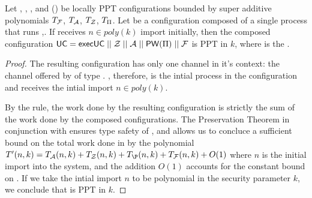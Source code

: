 \begin{theorem} \label{thm:soundness}
Let \F, \A, \Z, and (\PI) be locally PPT configurations bounded by super additive polynomials $T_\mathcal{F}$, $T_\mathcal{A}$, $T_\mathcal{Z}$, $T_\Pi$. Let  be a configuration composed of a single process that runs ,. If  receives $n \in poly(k)$ import initially, then the composed configuration $\mathsf{UC} = \mathsf{execUC} \; || \; \mathcal{Z} \; || \; \mathcal{A} \; || \; \mathsf{PW}(\Pi) \; || \; \mathcal{F}$ is PPT in $k$, where  is the \partywrapper.
\end{theorem}

\begin{proof}
The resulting configuration  has only one channel in it's context: the channel offered by  of type . 
, therefore, is the intial process in the configuration and receives the intial import $n \in poly(k)$.

By the  rule, the work done by the resulting configuration is strictly the sum of the work done by the composed configurations. 
The Preservation Theorem in conjunction with  ensures type safety of , and allows us to concluce a sufficient bound on the total work done in  by the polynomial $T'(n,k) = T_\A(n,k) + T_\Z(n,k) + T_\P(n,k) + T_\F(n,k) + O(1)$ where $n$ is the initial import into the system, and the addition $O(1)$ accounts for the constant bound on .
If we take the intial import $n$ to be polynomial in the security parameter $k$, we conclude that  is PPT in $k$.
\end{proof}


